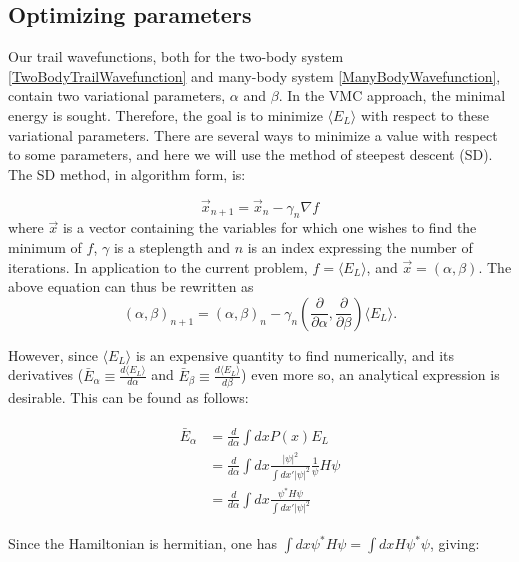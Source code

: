 \documentclass[english, a4paper]{article}
\newcommand\lr[1]{\left(#1\right)}
\begin{document}
	
	
	\subsection{Optimizing parameters}
	Our trail wavefunctions, both for the two-body system \eqref{TwoBodyTrailWavefunction} and many-body system \eqref{ManyBodyWavefunction}, contain two variational parameters, $\alpha$ and $\beta$.
	In the VMC approach, the minimal energy is sought. Therefore, the goal is to minimize $\langle E_L\rangle$ with respect to these variational parameters.
	There are several ways to minimize a value with respect to some parameters, and here we will use the method of steepest descent (SD). The SD method, in algorithm form, is:
	
	\begin{equation}
		\vec{x}_{n+1} = \vec{x}_n - \gamma_n\nabla f
	\end{equation}
	where $\vec{x}$ is a vector containing the variables for which one wishes to find the minimum of $f$, $\gamma$ is a steplength and $n$ is an index expressing the number of iterations. In application to the current problem, $f = \langle E_L\rangle$, and $\vec{x}=\lr{\alpha, \beta}$. The above equation can thus be rewritten as
	\begin{equation}
	\lr{\alpha, \beta}_{n+1} = \lr{\alpha, \beta}_n - \gamma_n(\frac{\partial}{\partial \alpha}, \frac{\partial}{\partial \beta})  \langle E_L\rangle. \label{optimizationAlgo}
	\end{equation}
	
	 However, since $\langle E_L\rangle$ is an expensive quantity to find numerically, and its derivatives ($\bar{E}_\alpha \equiv \frac{d\langle E_L\rangle}{d\alpha}$ and $\bar{E}_\beta \equiv \frac{d\langle E_L\rangle}{d\beta}$) even more so, an analytical expression is desirable. This can be found as follows:
	
	\begin{align}
	\begin{split}
	\bar{E}_\alpha &= \frac{d}{d\alpha}\int dx P(x) E_L\\
	&= \frac{d}{d\alpha}\int dx \frac{|\psi|^2}{\int dx'|\psi|^2}\frac{1}{\psi}H\psi\\
	&= \frac{d}{d\alpha}\int dx \frac{\psi^*H\psi}{\int dx'|\psi|^2}
	\end{split}
	\end{align}
	
	Since the Hamiltonian is hermitian, one has $\int dx\psi^* H \psi = \int dx H\psi^*\psi$, giving:
	
\end{document}
